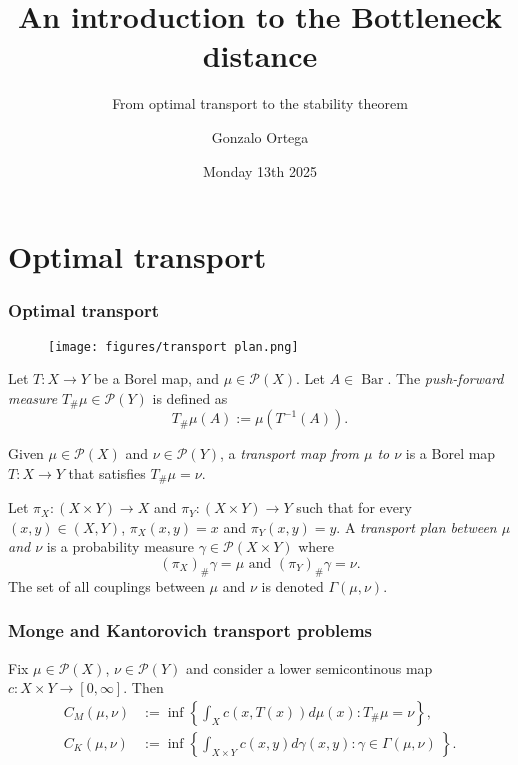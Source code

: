 \documentclass[aspectratio=169]{beamer}
\title{An introduction to the Bottleneck distance}
\subtitle{From optimal transport to the stability theorem}
\author{Gonzalo Ortega}
\date{Monday 13th 2025}
\newcommand{\brc}{\operatorname{Bar}}
\newcommand{\p}{\mathcal P}
\newcommand{\B}{\brc}
\newcommand{\T}{T_\#}
\begin{document}
\frame{\titlepage}


\section{Optimal transport}
  \begin{frame}
    \frametitle{Optimal transport}
    \begin{figure}
      \texttt{[image: figures/transport plan.png]}
    \end{figure}
  \end{frame}

  \begin{frame}
    \begin{definition}
      Let $ T: X \to Y $ be a Borel map, and $ \mu \in \p(X)$. Let $ A \in \B $. The {\it push-forward measure} $ \T\mu \in \p(Y) $ is defined as
      $$
          \T\mu(A) := \mu (T^{-1}(A)).
      $$
  \end{definition}

  \begin{definition}
      Given $ \mu \in \p(X) $ and $ \nu \in \p(Y) $, a {\it transport map from $\mu$ to $\nu$} is a Borel map $ T: X \to Y $ that satisfies $ \T\mu = \nu$.
  \end{definition}
  
  
  \begin{definition}
      Let $\pi_X : (X \times Y) \to X $ and $\pi_Y : (X \times Y) \to Y$ such that for every $(x, y) \in (X, Y) $, $\pi_X(x, y) = x$ and $ \pi_Y(x, y) = y $. A {\it transport plan between $\mu$ and $\nu$} is a probability measure $ \gamma \in \p(X \times Y) $ where
      $$
          (\pi_X)_\# \gamma = \mu \text{ and } (\pi_Y)_\# \gamma = \nu.
      $$
      The set of all couplings between $ \mu $ and $\nu$ is denoted $\Gamma(\mu, \nu)$.
  \end{definition}
  \end{frame}

  \begin{frame}
    \frametitle{Monge and Kantorovich transport problems}
    \begin{definition}
      Fix $ \mu \in \p(X)$, $\nu \in \p(Y)$ and consider a lower semicontinous map $ c: X \times Y \to [0, \infty] $. Then
  \begin{align*}
      C_M(\mu, \nu) &:= \inf \left\{\int_X c(x, T(x)) d\mu(x) : \T\mu = \nu \right\}, \\
      C_K(\mu, \nu) &:= \inf \left\{\int_{X \times Y} c(x, y) d\gamma(x,y) : \gamma \in \Gamma(\mu, \nu) \ \right\}.
  \end{align*}
  \end{definition}
  \end{frame}
\end{document}
